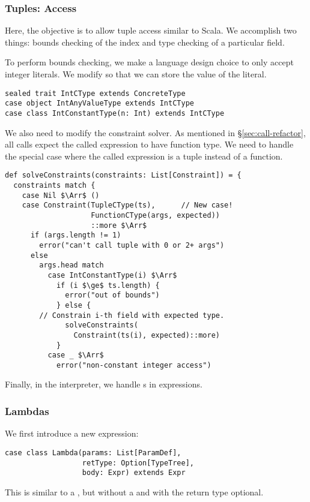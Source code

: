 \subsubsection{Tuples: Access}
Here, the objective is to allow tuple access similar to Scala. We accomplish two things: bounds checking of the index and type checking of a particular field.

To perform bounds checking, we make a language design choice to only accept integer literals. We modify  so that we can store the value of the literal.\footnotemark
\begin{lstlisting}
sealed trait IntCType extends ConcreteType
case object IntAnyValueType extends IntCType
case class IntConstantType(n: Int) extends IntCType
\end{lstlisting}

\noindent
We also need to modify the constraint solver.
As mentioned in §\ref{sec:call-refactor}, all calls expect the called expression to have function type. We need to handle the special case where the called expression is a tuple instead of a function.

\begin{lstlisting}
def solveConstraints(constraints: List[Constraint]) = {
  constraints match {
    case Nil $\Arr$ ()
    case Constraint(TupleCType(ts),      // New case!
                    FunctionCType(args, expected))
                    ::more $\Arr$
      if (args.length != 1)
        error("can't call tuple with 0 or 2+ args")
      else
        args.head match
          case IntConstantType(i) $\Arr$
            if (i $\ge$ ts.length) {
              error("out of bounds")
            } else {
        // Constrain i-th field with expected type.
              solveConstraints(
                Constraint(ts(i), expected)::more)
            }
          case _ $\Arr$
            error("non-constant integer access")
\end{lstlisting}

\noindent
Finally, in the interpreter, we handle s in  expressions.


\subsubsection{Lambdas}\label{sec:lambdas}
We first introduce a new expression:
\begin{lstlisting}
case class Lambda(params: List[ParamDef],
                  retType: Option[TypeTree],
                  body: Expr) extends Expr
\end{lstlisting}
This is similar to a , but without a  and with the return type optional.

